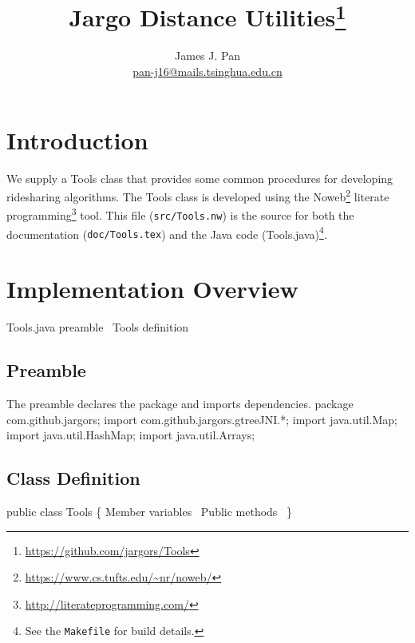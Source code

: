 \documentclass{article}
\title{Jargo Distance Utilities\footnote{
  \url{https://github.com/jargors/Tools}}}
\author{James J. Pan\\
  \small{\href{mailto:pan-j16@mails.tsinghua.edu.cn}{pan-j16@mails.tsinghua.edu.cn}}}
\def\nwendcode{\endtrivlist \endgroup}      %
\let\nwdocspar=\par
\begin{document}
\maketitle
\pagestyle{noweb}

\tableofcontents

\section{Introduction}
\label{sec:introduction}
We supply a Tools class that provides some common procedures for developing
ridesharing algorithms.  The Tools class is developed using the
Noweb\footnote{\url{https://www.cs.tufts.edu/~nr/noweb/}} literate
programming\footnote{\url{http://literateprogramming.com/}} tool.  This file
({\tt{}src/Tools.nw}) is the source for both the documentation ({\tt{}doc/Tools.tex})
and the Java code (Tools.java)\footnote{See the {\tt{}Makefile} for build
details.}.

\section{Implementation Overview}
\endmoddef{}
\LA{}Tools.java preamble~{\nwtagstyle{}}\RA{}
\LA{}\code{}Tools\edoc{} definition~{\nwtagstyle{}}\RA{}
\nwendcode{}\nwdocspar

\subsection{Preamble}
The preamble declares the package and imports dependencies.
\nwenddocs{}\endmoddef{}
package com.github.jargors;
import com.github.jargors.gtreeJNI.*;
import java.util.Map;
import java.util.HashMap;
import java.util.Arrays;
\nwendcode{}\nwdocspar

\subsection{Class Definition}
\nwenddocs{}\endmoddef{}
public class Tools \{
  \LA{}Member variables~{\nwtagstyle{}}\RA{}
  \LA{}Public methods~{\nwtagstyle{}}\RA{}
\}
\nwendcode{}\nwdocspar
\end{document}
